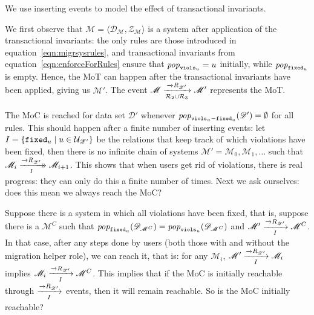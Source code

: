 \documentclass[runningheads]{llncs}
\newcommand{\xrightarrowdbl}[2][]{%
  \xrightarrow[#1]{#2}\mathrel{\mkern-14mu}\rightarrow
}
\newcommand{\id}[1]{\text{\it #1\/}}
\newcommand{\popF}[1]{\id{pop}_{#1}}
\newcommand{\pop}[2]{\popF{#1}(#2)}
\newcommand{\pair}[2]{\langle{#1},{#2}\rangle}
\newcommand{\rels}{\mathcal{R}}   %
\newcommand{\rules}{\mathcal{U}}
\newcommand{\dataset}{\mathscr{D}}
\newcommand{\schema}{\mathscr{Z}}
\newcommand{\migrsys}{\mathscr{M}}
\newcommand{\infsys}{\mathscr{S}}
\begin{document}
We use inserting events to model the effect of transactional invariants.


   We first observe that $\migrsys = \pair{\dataset_\migrsys}{\schema_\migrsys}$ is a system after application of the transactional invariants:
   the only rules are those introduced in equation~\ref{eqn:migrsysrules}, and transactional invariants from equation~\ref{eqn:enforceForRules} ensure that $\popF{{\tt viols}_u} = u$ initially, while $\popF{{\tt fixed}_u}$ is empty.
   Hence, the MoT can happen after the transactional invariants have been applied, giving us $\migrsys'$.
   The event $\migrsys \xrightarrow[\rels_2 \cup \rels_3]{\overrightarrow\rels_{\schema'}}\migrsys'$ represents the MoT.
   
   The MoC is reached for data set $\dataset'$ whenever $\pop{{\tt viols}_u - {\tt fixed}_u}{\dataset'}=\emptyset$ for all rules.
   This should happen after a finite number of inserting events: let $I = \{{\tt fixed}_u \mid u\in\rules_{\schema'}\}$ be the relations that keep track of which violations have been fixed, then there is no infinite chain of systems $\migrsys' = \migrsys_0, \migrsys_1,\ldots$ such that $\migrsys_i\xrightarrowdbl[I]{\overrightarrow\rels_{\schema'}}\migrsys_{i+1}$.
   This shows that when users get rid of violations, there is real progress: they can only do this a finite number of times.
   Next we ask ourselves: does this mean we always reach the MoC?
   
   Suppose there is a system in which all violations have been fixed, that is, suppose there is a $\migrsys^C$ such that $\pop{{\tt fixed}_u}{\dataset_{\migrsys^C}}=\pop{{\tt viols}_u}{\dataset_{\migrsys^C}}$ and $\migrsys'\xrightarrow[I]{\overrightarrow\rels_{\schema'}} \migrsys^C$.
   In that case, after any steps done by users (both those with and without the migration helper role), we can reach it, that is: for any $\migrsys_i$, $\migrsys'\xrightarrow[I]{\overrightarrow\rels_{\schema'}} \migrsys_i$ implies $\migrsys_i\xrightarrow[I]{\overrightarrow\rels_{\schema'}} \migrsys^C$.
   This implies that if the MoC is initially reachable through $\xrightarrow[I]{\overrightarrow\rels_{\schema'}}$ events, then it will remain reachable.
   So is the MoC initially reachable?
   
\end{document}
